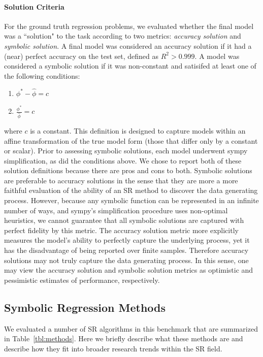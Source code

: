 \paragraph{Solution Criteria}
For the ground truth regression problems, we evaluated whether the final model was a ``solution" to the task according to two metrics: \textit{accuracy solution} and \textit{symbolic solution}. 
A final model was considered an accuracy solution if it had a (near) perfect accuracy on the test set, defined as $R^2>0.999$. 
A model was considered a symbolic solution if it was non-constant and satisifed at least one of the following conditions: 

\begin{enumerate}
    \item $\phi^*-\hat{\phi} = c $
    \item $\frac{\phi^*}{\hat{\phi}} = c $ 
\end{enumerate}

where $c$ is a constant. 
This definition is designed to capture models within an affine transformation of the true model form (those that differ only by a constant or scalar). 
Prior to assessing symbolic solutions, each model underwent sympy simplification, as did the conditions above. 
We chose to report both of these solution definitions because there are pros and cons to both. 
Symbolic solutions are preferable to accuracy solutions in the sense that they are more a more faithful evaluation of the ability of an SR method to discover the data generating process.
However, because any symbolic function can be represented in an infinite number of ways, and sympy's simplification procedure uses non-optimal heuristics, we cannot guarantee that all symbolic solutions are captured with perfect fidelity by this metric. 
The accuracy solution metric more explicitly measures the model's ability to perfectly capture the underlying process, yet it has the disadvantage of being reported over finite samples. 
Therefore accuracy solutions may not truly capture the data generating process. 
In this sense, one may view the accuracy solution and symbolic solution metrics as optimistic and pessimistic estimates of performance, respectively.

\subsection{Symbolic Regression Methods}

We evaluated a number of SR algorithms in this benchmark that are summarized in Table~\ref{tbl:methods}.
Here we briefly describe what these methods are and describe how they fit into broader research trends within the SR field. 

